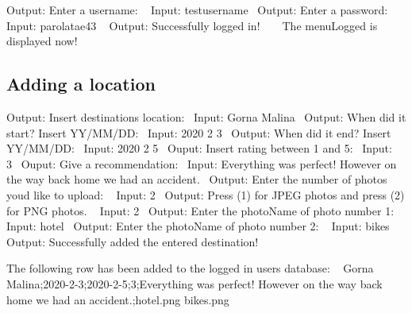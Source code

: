  Output\+: Enter a username\+: ~\newline
 Input\+: testusername~\newline
 Output\+: Enter a password\+: ~\newline
 Input\+: parolatae43 ~\newline
 Output\+: Successfully logged in! ~\newline
 ~\newline
 The menu\+Logged is displayed now! ~\newline
\hypertarget{index_locadd}{}\subsection{Adding a location}\label{index_locadd}
Output\+: Insert destination\textquotesingle{}s location\+:~\newline
 Input\+: Gorna Malina~\newline
 Output\+: When did it start? Insert Y\+Y/\+M\+M/\+DD\+:~\newline
 Input\+: 2020 2 3~\newline
 Output\+: When did it end? Insert Y\+Y/\+M\+M/\+DD\+:~\newline
 Input\+: 2020 2 5~\newline
 Ouput\+: Insert rating between 1 and 5\+:~\newline
 Input\+: 3~\newline
 Ouput\+: Give a recommendation\+:~\newline
 Input\+: Everything was perfect! However on the way back home we had an accident.~\newline
 Output\+: Enter the number of photos you\textquotesingle{}d like to upload\+: ~\newline
 Input\+: 2~\newline
 Output\+: Press (1) for J\+P\+EG photos and press (2) for P\+NG photos. ~\newline
 Input\+: 2~\newline
 Output\+: Enter the photo\+Name of photo number 1\+: ~\newline
 Input\+: hotel~\newline
 Output\+: Enter the photo\+Name of photo number 2\+: ~\newline
 Input\+: bikes~\newline
 Output\+: Successfully added the entered destination!~\newline


The following row has been added to the logged in user\textquotesingle{}s database\+: ~\newline
 Gorna Malina;2020-\/2-\/3;2020-\/2-\/5;3;Everything was perfect! However on the way back home we had an accident.;hotel.\+png bikes.\+png ~\newline
 
